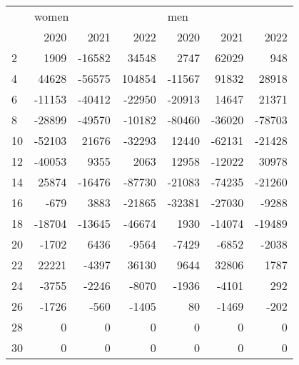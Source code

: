 \begin{tabular}{lrrrrrr}
\toprule
{} & \multicolumn{3}{l}{women} & \multicolumn{3}{l}{men} \\
{} &   2020 &   2021 &    2022 &   2020 &   2021 &   2022 \\
\midrule
2  &   1909 & -16582 &   34548 &   2747 &  62029 &    948 \\
4  &  44628 & -56575 &  104854 & -11567 &  91832 &  28918 \\
6  & -11153 & -40412 &  -22950 & -20913 &  14647 &  21371 \\
8  & -28899 & -49570 &  -10182 & -80460 & -36020 & -78703 \\
10 & -52103 &  21676 &  -32293 &  12440 & -62131 & -21428 \\
12 & -40053 &   9355 &    2063 &  12958 & -12022 &  30978 \\
14 &  25874 & -16476 &  -87730 & -21083 & -74235 & -21260 \\
16 &   -679 &   3883 &  -21865 & -32381 & -27030 &  -9288 \\
18 & -18704 & -13645 &  -46674 &   1930 & -14074 & -19489 \\
20 &  -1702 &   6436 &   -9564 &  -7429 &  -6852 &  -2038 \\
22 &  22221 &  -4397 &   36130 &   9644 &  32806 &   1787 \\
24 &  -3755 &  -2246 &   -8070 &  -1936 &  -4101 &    292 \\
26 &  -1726 &   -560 &   -1405 &     80 &  -1469 &   -202 \\
28 &      0 &      0 &       0 &      0 &      0 &      0 \\
30 &      0 &      0 &       0 &      0 &      0 &      0 \\
\bottomrule
\end{tabular}
